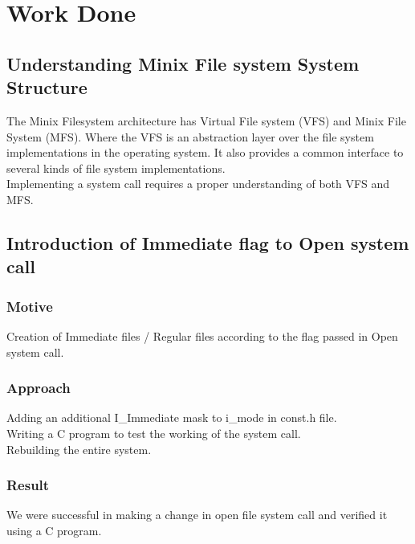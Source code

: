 \chapter{Work Done}

\section{Understanding Minix File system System Structure}

The Minix Filesystem architecture has Virtual File system (VFS) and Minix File System (MFS). Where the VFS is an abstraction layer over the file system implementations in the operating system. It also provides a common interface to several kinds of file system implementations. \\
Implementing a system call requires a proper understanding of both VFS and MFS.

\section{Introduction of Immediate flag to Open system call}
\subsection{Motive}
Creation of Immediate files / Regular files according to the flag passed in Open system call.
\subsection{Approach}
Adding an additional I\_Immediate mask to i\_mode in const.h file.\\	
Writing a C program to test the working of the system call.\\
Rebuilding the entire system.
\subsection{Result}
We were successful in making a change in open file system call and verified it using a C program.



